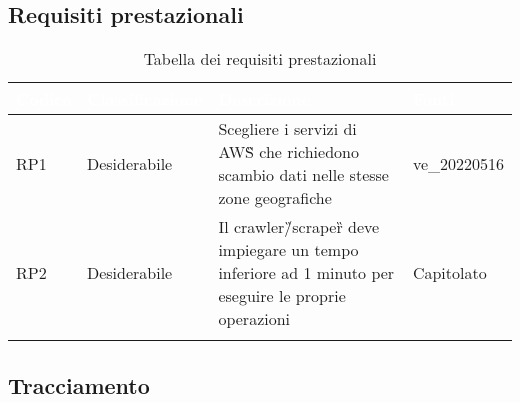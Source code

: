 \subsection{Requisiti prestazionali}
{
      \setlength{\freewidth}{\dimexpr\textwidth-10\tabcolsep}
      \renewcommand{\arraystretch}{1.5}
      \centering
      \setlength{\aboverulesep}{0pt}
      \setlength{\belowrulesep}{0pt}
      \begin{longtable}{C{.15\freewidth} C{.2\freewidth} C{.528\freewidth} C{.15\freewidth}}
         \toprule
      \textcolor{white}{\textbf{Codice}}&
      \textcolor{white}{\textbf{Classificazione}}&
      \textcolor{white}{\textbf{Descrizione}}&
      \textcolor{white}{\textbf{Fonti}}\\	
      \toprule
      \endhead
      
      RP1 & Desiderabile & Scegliere i servizi di AWS\G{} che richiedono scambio dati nelle stesse zone geografiche & ve\_20220516 \\
      RP2 & Desiderabile & Il crawler\G/scraper\G{} deve impiegare un tempo inferiore ad 1 minuto per eseguire le proprie operazioni & Capitolato \\	   
      \bottomrule
      \caption{Tabella dei requisiti prestazionali}
      \end{longtable}
}
\subsection{Tracciamento}
